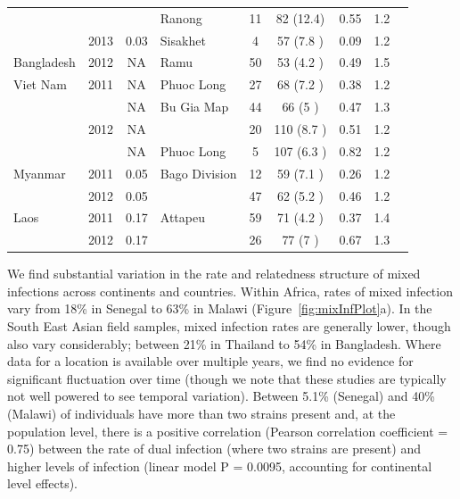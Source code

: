 \documentclass[9pt,lineno]{elife}
\begin{document}
\begin{table}[btp]
{\begin{tabular}{p{1.4cm} c c |p{1.7cm} c c c c p{2.7cm}}
                &               &      &Ranong&11   &82   (12.4)&0.55 &1.2  &\\
                &2013           &0.03  &Sisakhet&4    &57   (7.8 )&0.09 &1.2  &\\
\cline{1-8}
Bangladesh      &2012           &NA    &Ramu &50   &53   (4.2 )&0.49 &1.5  &\\
\cline{1-8}
Viet Nam        &2011           &NA    &Phuoc Long&27   &68   (7.2 )&0.38 &1.2  &\\
                &               &NA    &Bu Gia Map&44   &66   (5   )&0.47 &1.3  &\\
                &2012           &NA    &               &20   &110  (8.7 )&0.51 &1.2  &\\
                &               &NA    &Phuoc Long&5    &107  (6.3 )&0.82 &1.2  &\\
\cline{1-8}
Myanmar         &2011           &0.05  &Bago Division &12   &59   (7.1 )&0.26 &1.2  &\\
                &2012           &0.05  &               &47   &62   (5.2 )&0.46 &1.2  &\\
\cline{1-8}
Laos            &2011           &0.17  &Attapeu&59   &71   (4.2 )&0.37 &1.4  &\\
                &2012           &0.17  &               &26   &77   (7   )&0.67 &1.3  &\\
\hline
\bottomrule
\end{tabular}
}

\end{table}


We find substantial variation in the rate and relatedness structure of mixed infections across continents and countries.  Within Africa, rates of mixed infection vary from 18\% in Senegal to 63\% in Malawi (Figure~\ref{fig:mixInfPlot}a).  In the South East Asian field samples, mixed infection rates are generally lower, though also vary considerably; between 21\% in Thailand to 54\% in Bangladesh.  Where data for a location is available over multiple years, we find no evidence for significant fluctuation over time (though we note that these studies are typically not well powered to see temporal variation).  Between 5.1\% (Senegal) and 40\% (Malawi) of individuals have more than two strains present and, at the population level, there is a positive correlation (Pearson correlation coefficient = 0.75) between the rate of dual infection (where two strains are present) and higher levels of infection (linear model P = 0.0095, accounting for continental level effects).
\end{document}
